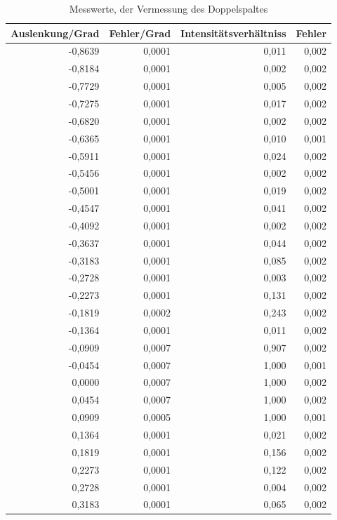 \documentclass[12pt]{scrartcl}
\begin{document}
\begin{table}[H]
\caption{Messwerte, der Vermessung des Doppelspaltes}
\begin{center}
\begin{tabular}{|r|r|r|r|}
\hline
\multicolumn{1}{|l|}{Auslenkung/Grad} & \multicolumn{1}{l|}{Fehler/Grad} & \multicolumn{1}{l|}{Intensitätsverhältniss} & \multicolumn{1}{l|}{Fehler} \\ \hline
-0,8639 & 0,0001 & 0,011 & 0,002 \\ \hline
-0,8184 & 0,0001 & 0,002 & 0,002 \\ \hline
-0,7729 & 0,0001 & 0,005 & 0,002 \\ \hline
-0,7275 & 0,0001 & 0,017 & 0,002 \\ \hline
-0,6820 & 0,0001 & 0,002 & 0,002 \\ \hline
-0,6365 & 0,0001 & 0,010 & 0,001 \\ \hline
-0,5911 & 0,0001 & 0,024 & 0,002 \\ \hline
-0,5456 & 0,0001 & 0,002 & 0,002 \\ \hline
-0,5001 & 0,0001 & 0,019 & 0,002 \\ \hline
-0,4547 & 0,0001 & 0,041 & 0,002 \\ \hline
-0,4092 & 0,0001 & 0,002 & 0,002 \\ \hline
-0,3637 & 0,0001 & 0,044 & 0,002 \\ \hline
-0,3183 & 0,0001 & 0,085 & 0,002 \\ \hline
-0,2728 & 0,0001 & 0,003 & 0,002 \\ \hline
-0,2273 & 0,0001 & 0,131 & 0,002 \\ \hline
-0,1819 & 0,0002 & 0,243 & 0,002 \\ \hline
-0,1364 & 0,0001 & 0,011 & 0,002 \\ \hline
-0,0909 & 0,0007 & 0,907 & 0,002 \\ \hline
-0,0454 & 0,0007 & 1,000 & 0,001 \\ \hline
0,0000 & 0,0007 & 1,000 & 0,002 \\ \hline
0,0454 & 0,0007 & 1,000 & 0,002 \\ \hline
0,0909 & 0,0005 & 1,000 & 0,001 \\ \hline
0,1364 & 0,0001 & 0,021 & 0,002 \\ \hline
0,1819 & 0,0001 & 0,156 & 0,002 \\ \hline
0,2273 & 0,0001 & 0,122 & 0,002 \\ \hline
0,2728 & 0,0001 & 0,004 & 0,002 \\ \hline
0,3183 & 0,0001 & 0,065 & 0,002 \\ \hline

\end{tabular}
\end{center}
\end{table}
\end{document}
